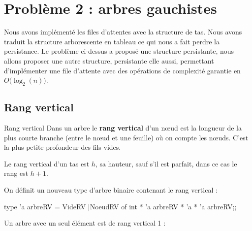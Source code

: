 \section{Problème 2 : arbres gauchistes}
Nous avons implémenté les files d'attentes avec la structure de tas. Nous avons traduit la structure arborescente en tableau ce qui nous a fait perdre la persistance. Le problème ci-dessus a proposé une structure persistante, nous allons proposer une autre structure, persistante elle aussi, permettant d'implémenter une file d'attente avec des opérations de complexité garantie en $O\bigl(\log_2(n)\bigr)$.
\subsection{Rang vertical}
\begin{defin}{Rang vertical}{}
Dans un arbre le {\bf rang vertical} d'un nœud est la longueur de la plus courte branche (entre le nœud et une feuille) où on compte les nœuds. C'est la plus petite profondeur des fils vides.\end{defin}

Le rang vertical d'un tas est $h$, sa hauteur, sauf s'il est parfait, dans ce cas le rang est $h+1$.

On définit un nouveau type d'arbre binaire contenant le rang vertical :

\begin{ocaml}
type 'a arbreRV = VideRV 
                 |NoeudRV of int * 'a arbreRV * 'a * 'a arbreRV;;
\end{ocaml}

Un arbre avec un seul élément est de rang vertical 1 : 

